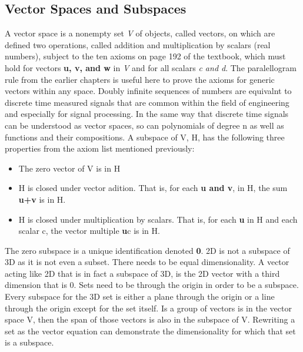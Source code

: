 \documentclass[12pt]{article}
\begin{document}
\subsection{Vector Spaces and Subspaces}
A vector space is a nonempty set \textit{V} of objects, called vectors, on which are defined two operations, called addition and multiplication by scalars (real numbers), %
subject to the ten axioms on page 192 of the textbook, which must hold for vectors \textbf{u, v, and w} in \textit{V} and for all scalars \textit{c and d}. The paralellogram %
rule from the earlier chapters is useful here to prove the axioms for generic vectors within any space. Doubly infinite sequences of numbers are equivalnt to discrete time %
measured signals that are common within the field of engineering and especially for signal processing. In the same way that discrete time signals can be understood as %
vector spaces, so can polynomials of degree n as well as functions and their compositions. 
\newline
\newline
A subspace of V, H, has the following three properties from the axiom list mentioned previously:
\begin{itemize}
    \item The zero vector of V is in H
    \item H is closed under vector adition. That is, for each \textbf{u and v}, in H, the sum \textbf{u+v} is in H. 
    \item H is closed under multiplication by scalars. That is, for each \textbf{u} in H and each scalar c, the vector multiple \textbf{u}c is in H. 
\end{itemize} 
The zero subspace is a unique identification denoted {\textbf{0}}. 2D is not a subspace of 3D as it is not even a subset. There needs to be equal dimensionality. A vector %
acting like 2D that is in fact a subspace of 3D, is the 2D vector with a third dimension that is 0. Sets need to be through the origin in order to be a subspace. Every %
subspace for the 3D set is either a plane through the origin or a line through the origin except for the set itself. Is a group of vectors is in the vector space V, then %
the span of those vectors is also in the subspace of V. Rewriting a set as the vector equation can demonstrate the dimensionality for which that set is a subspace. %
\end{document}
